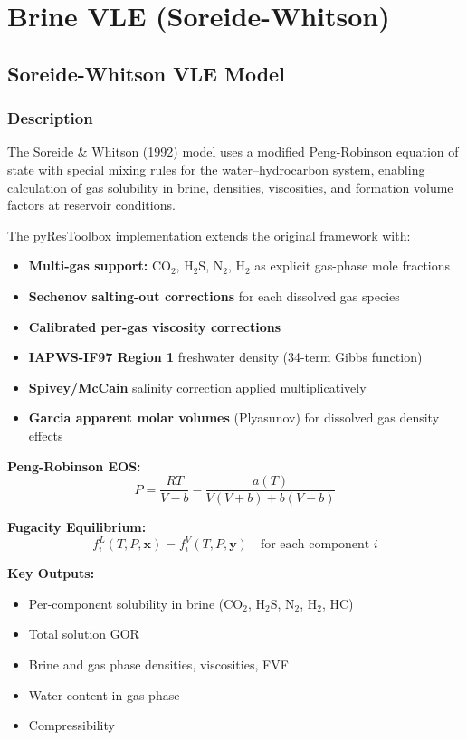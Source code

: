 \documentclass[11pt,a4paper]{article}
\begin{document}
\newpage

\section{Brine VLE (Soreide-Whitson)}

\subsection{Soreide-Whitson VLE Model}

\subsubsection{Description}
The Soreide \& Whitson (1992) model uses a modified Peng-Robinson equation of state with special mixing rules for the water--hydrocarbon system, enabling calculation of gas solubility in brine, densities, viscosities, and formation volume factors at reservoir conditions.

The pyResToolbox implementation extends the original framework with:
\begin{itemize}
\item \textbf{Multi-gas support:} CO$_2$, H$_2$S, N$_2$, H$_2$ as explicit gas-phase mole fractions
\item \textbf{Sechenov salting-out corrections} for each dissolved gas species
\item \textbf{Calibrated per-gas viscosity corrections}
\item \textbf{IAPWS-IF97 Region 1} freshwater density (34-term Gibbs function)
\item \textbf{Spivey/McCain} salinity correction applied multiplicatively
\item \textbf{Garcia apparent molar volumes} (Plyasunov) for dissolved gas density effects
\end{itemize}

\begin{tcolorbox}[colback=formulabox,colframe=black!75]
\textbf{Peng-Robinson EOS:}
\begin{equation}
P = \frac{RT}{V - b} - \frac{a(T)}{V(V+b) + b(V-b)}
\end{equation}

\textbf{Fugacity Equilibrium:}
\begin{equation}
f_i^L(T, P, \mathbf{x}) = f_i^V(T, P, \mathbf{y}) \quad \text{for each component } i
\end{equation}

\textbf{Key Outputs:}
\begin{itemize}
\item Per-component solubility in brine (CO$_2$, H$_2$S, N$_2$, H$_2$, HC)
\item Total solution GOR
\item Brine and gas phase densities, viscosities, FVF
\item Water content in gas phase
\item Compressibility
\end{itemize}
\end{tcolorbox}
\end{document}
